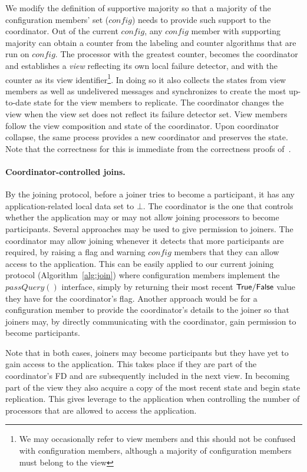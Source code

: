 \documentclass[11pt]{article}
\begin{document}
We modify the definition of supportive majority so that a majority of the configuration members' set ($config$) needs to provide such support to the coordinator.
Out of the current $config$, any $config$ member with supporting majority can obtain a counter from the labeling and counter algorithms that are run on $config$. 
The processor with the greatest counter, becomes the coordinator and establishes a \emph{view} reflecting its own local failure detector, and with the counter as its view identifier{\footnote{We may occasionally refer to view members and this should not be confused with configuration members, although a majority of configuration members must belong to the view}}.
In doing so it also collects the states from view members as well as undelivered messages and synchronizes to create the most up-to-date state for the view members to replicate.
The coordinator changes the view when the view set does not reflect its failure detector set.
View members follow the view composition and state of the coordinator.
Upon coordinator collapse, the same process provides a new coordinator and preserves the state. Note that the correctness for this is immediate from the correctness proofs of~\cite{SSVS}.

\paragraph{Coordinator-controlled joins.}
By the joining protocol, before a joiner tries to become a participant, it has any application-related local data set to $\bot$. The coordinator is the one that controls whether the application may or may not allow joining processors to become participants.
Several approaches may be used to give permission to joiners.
The coordinator may allow joining whenever it detects that more participants are required, by raising a flag and warning $config$ members that they can allow access to the application. 
This can be easily applied to our current joining protocol (Algorithm~\ref{alg:join}) where configuration members implement the $passQuery()$ interface, simply by returning their most recent $\sf True/False$ value they have for the coordinator's flag.
Another approach would be for a configuration member to provide the coordinator's details to the joiner so that joiners may, by directly communicating with the coordinator, gain permission to become participants.

Note that in both cases, joiners may become participants but they have yet to gain access to the application.
This takes place if they are part of the coordinator's FD and are subsequently included in the next view.
In becoming part of the view they also acquire a copy of the most recent state and begin state replication.
This gives leverage to the application when controlling the number of processors that are allowed to access the application. 
\end{document}
